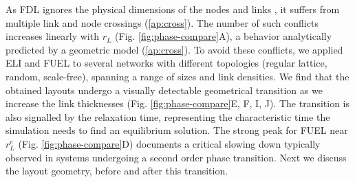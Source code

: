 \documentclass[nofootinbib,preprint,floatfix,titlepage,superscriptaddress]{revtex4} %
\begin{document}
As FDL ignores the physical dimensions of the nodes and links%
, it suffers from multiple link and node crossings (\ref{ap:cross}). %
The number of such conflicts increases linearly with $r_L$ (Fig. \ref{fig:phase-compare}A), a behavior analytically predicted by a geometric model (\ref{ap:cross}). %
To avoid these conflicts, we applied ELI and FUEL to several networks with different topologies (regular lattice, random, scale-free), spanning a range of sizes and link densities. 
We find that the obtained layouts undergo a visually detectable geometrical transition as we increase the link thicknesses (Fig. \ref{fig:phase-compare}E, F, I, J). 
The transition is also signalled by the relaxation time, representing the characteristic time the simulation needs to find an equilibrium solution. The strong peak for FUEL near $r_L^c$ (Fig. \ref{fig:phase-compare}D)
documents a critical slowing down typically observed in systems undergoing a second order phase transition. 
Next we discuss the layout geometry, before and after this transition.%
\end{document}

